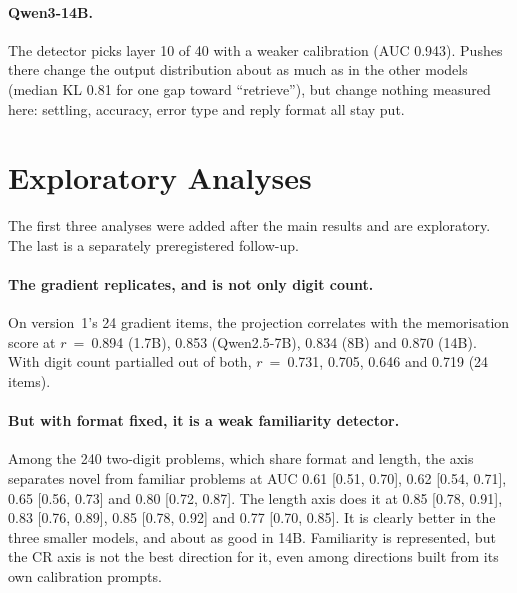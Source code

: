 \documentclass[11pt]{article}
\begin{document}
\paragraph{Qwen3-14B.} The detector picks layer 10 of 40 with a weaker calibration (AUC 0.943). Pushes there change the output distribution about as much as in the other models (median KL 0.81 for one gap toward ``retrieve''), but change nothing measured here: settling, accuracy, error type and reply format all stay put.

\section{Exploratory Analyses}\label{sec:explore}

The first three analyses were added after the main results and are exploratory. The last is a separately preregistered follow-up.

\paragraph{The gradient replicates, and is not only digit count.} On version~1's 24 gradient items, the projection correlates with the memorisation score at $r$~=~0.894 (1.7B), 0.853 (Qwen2.5-7B), 0.834 (8B) and 0.870 (14B). With digit count partialled out of both, $r$~=~0.731, 0.705, 0.646 and 0.719 (24 items).

\paragraph{But with format fixed, it is a weak familiarity detector.} Among the 240 two-digit problems, which share format and length, the axis separates novel from familiar problems at AUC 0.61 [0.51, 0.70], 0.62 [0.54, 0.71], 0.65 [0.56, 0.73] and 0.80 [0.72, 0.87]. The length axis does it at 0.85 [0.78, 0.91], 0.83 [0.76, 0.89], 0.85 [0.78, 0.92] and 0.77 [0.70, 0.85]. It is clearly better in the three smaller models, and about as good in 14B. Familiarity is represented, but the CR axis is not the best direction for it, even among directions built from its own calibration prompts.
\end{document}
